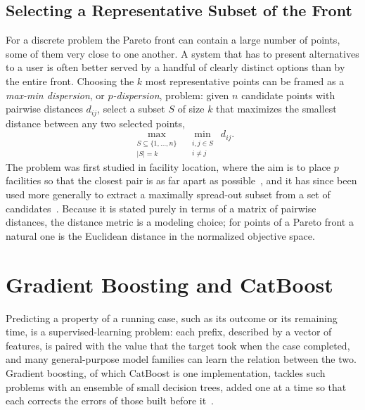 \subsection{Selecting a Representative Subset of the Front}
    \label{subsec:bg:moo:dispersion}
    For a discrete problem the Pareto front can contain a large number of points,
    some of them very close to one another. A system that has to present
    alternatives to a user is often better served by a handful of clearly
    distinct options than by the entire front. Choosing the $k$ most
    representative points can be framed as a \emph{max-min dispersion}, or
    \emph{$p$-dispersion}, problem: given $n$ candidate points with pairwise
    distances $d_{ij}$, select a subset $S$ of size $k$ that maximizes the
    smallest distance between any two selected points,
    \begin{equation}
        \max_{\substack{S \subseteq \{1, \dots, n\} \\ |S| = k}}\ \
        \min_{\substack{i, j \in S \\ i \neq j}}\ d_{ij}.
        \label{eq:bg:moo:dispersion}
    \end{equation}
    The problem was first studied in facility location, where the aim is to place
    $p$ facilities so that the closest pair is as far apart as
    possible~\cite{kuby1987}, and it has since been used more generally to
    extract a maximally spread-out subset from a set of
    candidates~\cite{maliszewski2012}. Because it is stated purely in terms of a
    matrix of pairwise distances, the distance metric is a modeling choice;
    for points of a Pareto front a natural one is the Euclidean distance in
    the normalized objective space.
    
\section{Gradient Boosting and CatBoost}
\label{sec:bg:gbm}
Predicting a property of a running case, such as its outcome or its remaining
time, is a supervised-learning problem: each prefix, described by a vector of
features, is paired with the value that the target took when the case
completed, and many general-purpose model families can learn the relation
between the two. Gradient boosting, of which CatBoost is one implementation, tackles
such problems with an ensemble of small decision trees, added one at a time so
that each corrects the errors of those built before
it~\cite{friedman2001,prokhorenkova2018}.

